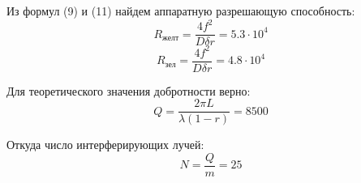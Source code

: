 \documentclass[14pt]{article}
\begin{document}
\vspace{1cm}
Из формул (9) и (11) найдем аппаратную разрешающую способность:
$$
	R_\text{желт} = \frac{4f^2}{D\delta r} = 5.3\cdot10^4
$$
$$
	R_\text{зел}  = \frac{4f^2}{D\delta r} = 4.8\cdot10^4
$$

\vspace{0.5cm}
Для теоретического значения добротности верно:
$$
	Q = \frac{2\pi L}{\lambda(1-r)} = 8500
$$

Откуда число интерферирующих лучей:
$$
	N = \frac{Q}{m} = 25
$$
\end{document}
